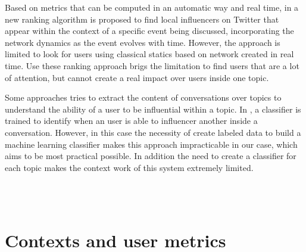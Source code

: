 \documentclass[runningheads]{llncs}
\begin{document}
Based on metrics that can be computed in an automatic way and real time, in \cite{Kardara2015} a new ranking algorithm is proposed to find local influencers on Twitter that appear within the context of a specific event being discussed, incorporating the network dynamics as the event evolves with time. However, the approach is limited to look for users using classical statics based on network created in real time. Use these ranking approach brigs the limitation to find users that are a lot of attention, but cannot create a real impact over users inside one topic.

Some approaches tries to extract the content of conversations over topics to understand the ability of a user to be influential within a topic. In \cite{Biran2012}, a classifier is trained to identify when an user is able to influencer another inside a conversation. However, in this case the necessity of create labeled data to build a machine learning classifier makes this approach impracticable in our case, which aims to be most practical possible. In addition the need to create a classifier for each topic makes the context work of this system extremely limited.


\\
	
\\



\section{Contexts and user metrics}
\end{document}
